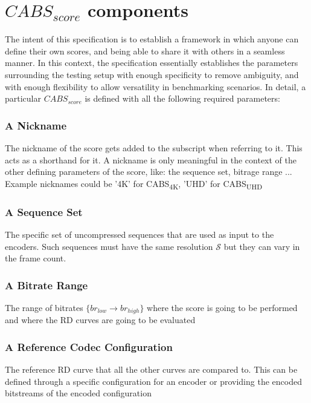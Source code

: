 \documentclass[12pt, conference, hidelinks, onecolumn]{IEEEtran}
\begin{document}
\section{$CABS_{score}$ components}
The intent of this specification is to establish a framework in which anyone can define their own scores, and being able to share it with others in a seamless manner. In this context, the specification essentially establishes the parameters surrounding the testing setup with enough specificity to remove ambiguity, and with enough flexibility to allow versatility in benchmarking scenarios. In detail, a particular $CABS_{score}$ is defined with all the following required parameters:

\subsubsection{A Nickname}
\label{subsec:nickname}
The nickname of the score gets added to the subscript when referring to it. This acts as a shorthand for it. A nickname is only meaningful in the context of the other defining parameters of the score, like: the sequence set, bitrage range ... Example nicknames could be '4K' for CABS\textsubscript{4K}, 'UHD' for CABS\textsubscript{UHD}


\subsubsection{A Sequence Set}
\label{subsec:sequenceset}
The specific set of uncompressed sequences that are used as input to the encoders. Such sequences must have the same resolution $\mathcal{S}$ but they can vary in the frame count.


\subsubsection{A Bitrate Range}
\label{subsec:bitraterange}
The range of bitrates $\lbrace br_{low} \to br_{high} \rbrace $ where the score is going to be performed and where the RD curves are going to be evaluated


\subsubsection{A Reference Codec Configuration}
\label{subsec:refcodecconfig}
The reference RD curve that all the other curves are compared to. This can be defined through a specific configuration for an encoder or providing the encoded bitstreams of the encoded configuration
\end{document}

